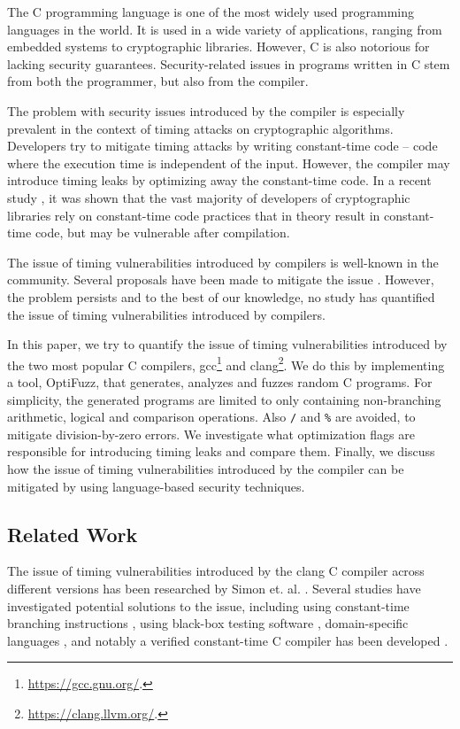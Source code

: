 The C programming language is one of the most widely used programming languages in the world. 
It is used in a wide variety of applications, ranging from embedded systems to cryptographic libraries. 
However, C is also notorious for lacking security guarantees.
Security-related issues in programs written in C stem from both the programmer, but also from the compiler.

The problem with security issues introduced by the compiler is especially prevalent in the context of timing attacks on cryptographic algorithms. 
Developers try to mitigate timing attacks by writing constant-time code -- code where the execution time is independent of the input.
However, the compiler may introduce timing leaks by optimizing away the constant-time code.
In a recent study \citep{developer-survey-timing-attacks}, it was shown that the vast majority of developers of cryptographic libraries rely on constant-time code practices that in theory result in constant-time code, but may be vulnerable after compilation.

The issue of timing vulnerabilities introduced by compilers is well-known in the community.
Several proposals have been made to mitigate the issue \citep{what-you-c, dudect, fact, verified-constant-time-c-comiler}.
However, the problem persists and to the best of our knowledge, no study has quantified the issue of timing vulnerabilities introduced by compilers.

In this paper, we try to quantify the issue of timing vulnerabilities introduced by the two most popular C compilers, gcc\footnote{\url{https://gcc.gnu.org/}.} and clang\footnote{\url{https://clang.llvm.org/}.}.
We do this by implementing a tool, OptiFuzz, that generates, analyzes and fuzzes random C programs.
For simplicity, the generated programs are limited to only containing non-branching arithmetic, logical and comparison operations.
Also \texttt{/} and \texttt{\%} are avoided, to mitigate division-by-zero errors.
We investigate what optimization flags are responsible for introducing timing leaks and compare them.
Finally, we discuss how the issue of timing vulnerabilities introduced by the compiler can be mitigated by using language-based security techniques.

\subsection{Related Work}
The issue of timing vulnerabilities introduced by the clang C compiler across different versions has been researched by Simon et. al. \citep{what-you-c}. 
Several studies have investigated potential solutions to the issue, including using constant-time branching instructions \citep{what-you-c}, using black-box testing software \citep{dudect}, domain-specific languages \citep{fact}, and notably a verified constant-time C compiler has been developed \citep{verified-constant-time-c-comiler}.

